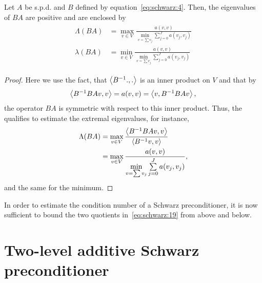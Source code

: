 \begin{theorem}
  Let $A$ be s.p.d. and $B$ defined by
  equation~\eqref{eq:schwarz:4}. Then, the eigenvalues of $BA$ are
  positive and are enclosed by
  \begin{gather}
    \label{eq:schwarz:19}
    \begin{split}
    \Lambda(BA) &= \max_{v\in V} \frac{a(v,v)}{\min\limits_{v=\sum v_j}
      \sum\limits_{j=0}^J a(v_j, v_j)}
    \\
    \lambda(BA) &= \min\limits_{v\in V} \frac{a(v,v)}{\min\limits_{v=\sum v_j}
      \sum\limits_{j=0}^J a(v_j, v_j)}      
    \end{split}
  \end{gather}
\end{theorem}

\begin{proof}
  Here we use the fact, that $\scal(B^{-1}.,.)$ is an inner product on
  $V$ and that by
  \begin{gather*}
    \scal(B^{-1}BA v,v) = a(v,v) = \scal(v, B^{-1}BA v),
  \end{gather*}
  the operator $BA$ is symmetric with respect to this inner
  product. Thus, the  qualifies to
  estimate the extremal eigenvalues, for instance,
  \begin{align*}
    \Lambda(BA)
    &= \max_{v\in V} \frac{\scal(B^{-1}BA v,v)}{\scal(B^{-1}v,v)} \\
    &= \max_{v\in V} \frac{a(v,v)}{\min\limits_{v=\sum v_j}
      \sum\limits_{j=0}^J a(v_j, v_j)},
  \end{align*}
  and the same for the minimum.
\end{proof}

\begin{note}
  In order to estimate the condition number of a Schwarz
  preconditioner, it is now sufficient to bound the two quotients
  in~\eqref{eq:schwarz:19} from above and below.
\end{note}

\section{Two-level additive Schwarz preconditioner}

